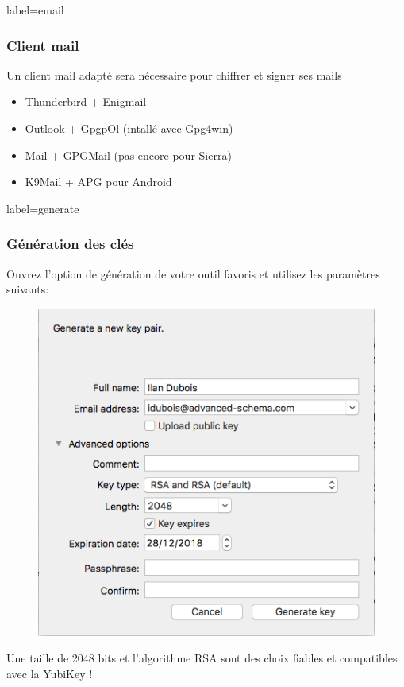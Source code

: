 \documentclass{beamer}
\begin{document}
        \begin{frame}{label=email}
            \frametitle{Client mail}
            Un client mail adapté sera nécessaire pour chiffrer et signer ses mails
            \begin{center}
                \begin{itemize}
                    \item Thunderbird + Enigmail
                    \item Outlook + GpgpOl (intallé avec Gpg4win)
                    \item Mail + GPGMail (pas encore pour Sierra)
                    \item K9Mail + APG pour Android
                \end{itemize}
            \end{center}
        \end{frame}
        \begin{frame}{label=generate}
            \frametitle{Génération des clés}
            Ouvrez l'option de génération de votre outil favoris et utilisez les paramètres suivants:
            \begin{center}
                \begin{figure}
                    \includegraphics[scale=0.30]{img/gen.png}
                \end{figure}
            \end{center}
            Une taille de 2048 bits et l'algorithme RSA sont des choix fiables et compatibles avec la YubiKey !\cite{length}
        \end{frame}
\end{document}
